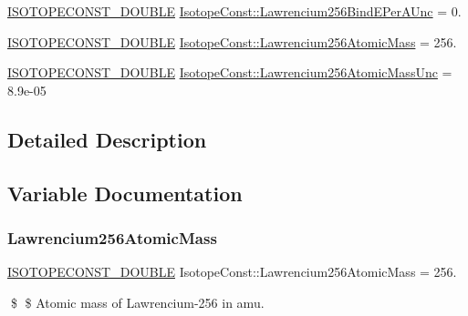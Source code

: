 \begin{DoxyCompactItemize}
\mbox{\hyperlink{group___isotope_const-_macros_ga8f45a7272ce02c0b4c65c44636ed719a}{I\+S\+O\+T\+O\+P\+E\+C\+O\+N\+S\+T\+\_\+\+D\+O\+U\+B\+LE}} \mbox{\hyperlink{group___isotope_const-_lawrencium-_lr256_gaf849d026627cd71b18c0bd2d336a988a}{Isotope\+Const\+::\+Lawrencium256\+Bind\+E\+Per\+A\+Unc}} = 0.
\item 
\mbox{\hyperlink{group___isotope_const-_macros_ga8f45a7272ce02c0b4c65c44636ed719a}{I\+S\+O\+T\+O\+P\+E\+C\+O\+N\+S\+T\+\_\+\+D\+O\+U\+B\+LE}} \mbox{\hyperlink{group___isotope_const-_lawrencium-_lr256_ga7e7843c069fcab0d2ef9f93ae99d54d5}{Isotope\+Const\+::\+Lawrencium256\+Atomic\+Mass}} = 256.
\item 
\mbox{\hyperlink{group___isotope_const-_macros_ga8f45a7272ce02c0b4c65c44636ed719a}{I\+S\+O\+T\+O\+P\+E\+C\+O\+N\+S\+T\+\_\+\+D\+O\+U\+B\+LE}} \mbox{\hyperlink{group___isotope_const-_lawrencium-_lr256_gaf25799d716c8d14cb207f8c554b3d12b}{Isotope\+Const\+::\+Lawrencium256\+Atomic\+Mass\+Unc}} = 8.\+9e-\/05
\end{DoxyCompactItemize}


\subsection{Detailed Description}


\subsection{Variable Documentation}
\mbox{\label{group___isotope_const-_lawrencium-_lr256_ga7e7843c069fcab0d2ef9f93ae99d54d5}} 
\subsubsection{\texorpdfstring{Lawrencium256\+Atomic\+Mass}{Lawrencium256AtomicMass}}
{\footnotesize\ttfamily \mbox{\hyperlink{group___isotope_const-_macros_ga8f45a7272ce02c0b4c65c44636ed719a}{I\+S\+O\+T\+O\+P\+E\+C\+O\+N\+S\+T\+\_\+\+D\+O\+U\+B\+LE}} Isotope\+Const\+::\+Lawrencium256\+Atomic\+Mass = 256.}

\$ \$ Atomic mass of Lawrencium-\/256 in amu. \mbox{\label{group___isotope_const-_lawrencium-_lr256_gaf25799d716c8d14cb207f8c554b3d12b}} 
